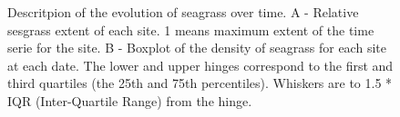 \documentclass[
  number]{elsarticle}
\begin{document}
\label{cell-fig-Extent}
\begin{figure}[H]


\caption{\label{fig-Extent}Descritpion of the evolution of seagrass over
time. A - Relative sesgrass extent of each site. 1 means maximum extent
of the time serie for the site. B - Boxplot of the density of seagrass
for each site at each date. The lower and upper hinges correspond to the
first and third quartiles (the 25th and 75th percentiles). Whiskers are
to 1.5 * IQR (Inter-Quartile Range) from the hinge.}

\end{figure}%


  
\end{document}
